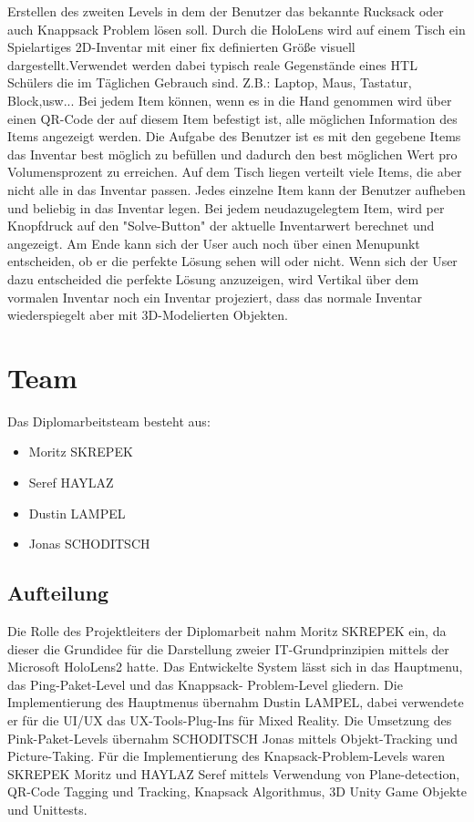 Erstellen des zweiten Levels in dem der Benutzer das bekannte Rucksack oder auch Knappsack
Problem lösen soll. Durch die HoloLens wird auf einem Tisch ein Spielartiges 2D-Inventar
mit einer fix definierten Größe visuell dargestellt.Verwendet werden dabei typisch reale
Gegenstände eines HTL Schülers die im Täglichen Gebrauch sind. Z.B.: Laptop, Maus, Tastatur,
Block,usw... Bei jedem Item können, wenn es in die Hand genommen wird über einen
QR-Code der auf diesem Item befestigt ist, alle möglichen Information des Items
angezeigt werden. Die Aufgabe des Benutzer ist es mit den gegebene Items das
Inventar best möglich zu befüllen und dadurch den best möglichen Wert pro
Volumensprozent zu erreichen. Auf dem Tisch liegen verteilt viele Items, die aber
nicht alle in das Inventar passen. Jedes einzelne Item kann der Benutzer aufheben
und beliebig in das Inventar legen. Bei jedem neudazugelegtem Item, wird per Knopfdruck auf den "Solve-Button"
der aktuelle Inventarwert berechnet und angezeigt. Am Ende kann sich der User auch noch über einen
Menupunkt entscheiden, ob er die perfekte Lösung sehen will oder nicht. Wenn sich der User dazu entscheided die
perfekte Lösung anzuzeigen, wird Vertikal über dem vormalen Inventar noch
ein Inventar projeziert, dass das normale Inventar wiederspiegelt aber mit
3D-Modelierten Objekten.

\section{Team}
Das Diplomarbeitsteam besteht aus:
\begin{itemize}
    \item Moritz SKREPEK
    \item Seref HAYLAZ
    \item Dustin LAMPEL
    \item Jonas SCHODITSCH
\end{itemize}


\subsection{Aufteilung}
Die Rolle des Projektleiters der Diplomarbeit nahm Moritz SKREPEK ein, da dieser die
Grundidee für die Darstellung zweier IT-Grundprinzipien mittels der Microsoft HoloLens2
hatte.
Das Entwickelte System lässt sich in das Hauptmenu, das Ping-Paket-Level und das Knappsack-
Problem-Level gliedern. Die Implementierung des Hauptmenus übernahm Dustin LAMPEL, dabei
verwendete er für die UI/UX das UX-Tools-Plug-Ins für Mixed Reality. Die Umsetzung des Pink-Paket-Levels
übernahm SCHODITSCH Jonas mittels Objekt-Tracking und Picture-Taking. Für die Implementierung des
Knapsack-Problem-Levels waren SKREPEK Moritz und HAYLAZ Seref mittels Verwendung von Plane-detection,
QR-Code Tagging und Tracking, Knapsack Algorithmus, 3D Unity Game Objekte und Unittests.



